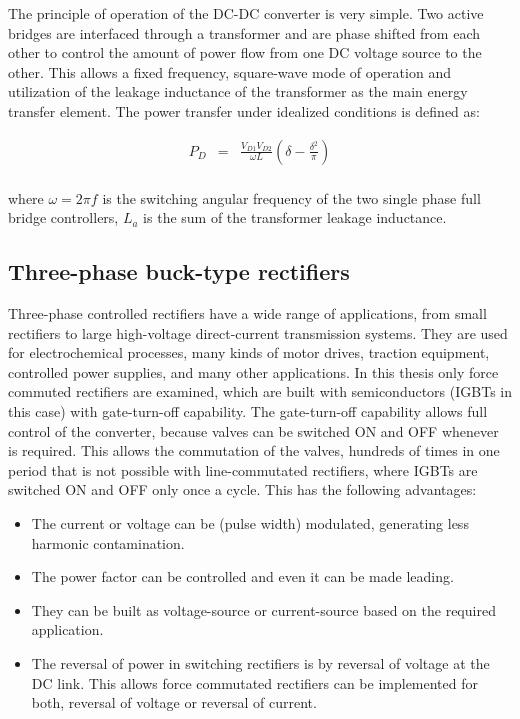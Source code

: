 The principle of operation of the DC-DC converter is very simple. Two active bridges are interfaced through a transformer and are phase shifted from each other to control the amount of power flow from one DC voltage source to the other. This allows a fixed frequency, square-wave mode of operation and utilization of the leakage inductance of the transformer as the main energy transfer element. The power transfer under idealized conditions is defined as:

\begin{equation}
        \begin{array}{rcl}
            P_D&=&\frac{V_{D1}V_{D2}}{\omega L}\left(\delta-\frac{\delta^2}{\pi}\right)\\
        \end{array}
        \label{BASICMPC:equ:DCDC}
    \end{equation}
		
		where $\omega=2\pi f$ is the switching angular frequency of the two single phase full bridge controllers, $L_a$ is the
sum of the transformer leakage inductance.

\subsection{Three-phase buck-type rectifiers}\label{BASICCSR:sec:CSR}

Three-phase controlled rectifiers have a wide range of applications, from small rectifiers to large high-voltage direct-current
transmission systems. They are used for electrochemical processes, many kinds of motor drives, traction equipment, controlled power supplies, and many other applications. In this thesis only force commuted rectifiers are examined, which are built with semiconductors (IGBTs in this case) with gate-turn-off capability. The gate-turn-off capability allows full control of the converter, because valves can be switched ON and OFF whenever is required. This allows the commutation of the valves, hundreds of times in one period that is not possible with line-commutated rectifiers, where IGBTs are switched ON and OFF only once a cycle. This has the following advantages:

\begin{itemize}
\item The current or voltage can be (pulse width) modulated, generating less harmonic contamination.
\item The power factor can be controlled and even it can be made leading.
\item They can be built as voltage-source or current-source based on the required application.
\item The reversal of power in switching rectifiers is by reversal of voltage at the DC link. This allows force commutated rectifiers can be implemented for both, reversal of voltage or reversal of current.
\end{itemize}

